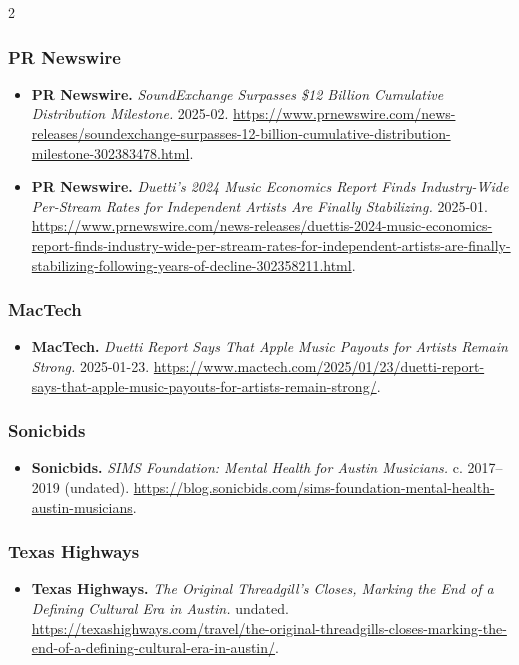 {\begin{multicols}{2}
\subsubsection*{PR Newswire}
\begin{itemize}[itemsep=0pt,topsep=1pt,parsep=0pt,partopsep=0pt,leftmargin=1em]
\item \textbf{PR Newswire.} \textit{SoundExchange Surpasses \$12 Billion Cumulative Distribution Milestone.} 2025-02. \url{https://www.prnewswire.com/news-releases/soundexchange-surpasses-12-billion-cumulative-distribution-milestone-302383478.html}.
\item \textbf{PR Newswire.} \textit{Duetti’s 2024 Music Economics Report Finds Industry-Wide Per-Stream Rates for Independent Artists Are Finally Stabilizing.} 2025-01. \url{https://www.prnewswire.com/news-releases/duettis-2024-music-economics-report-finds-industry-wide-per-stream-rates-for-independent-artists-are-finally-stabilizing-following-years-of-decline-302358211.html}.
\end{itemize}
\subsubsection*{MacTech}
\begin{itemize}[itemsep=0pt,topsep=1pt,parsep=0pt,partopsep=0pt,leftmargin=1em]
\item \textbf{MacTech.} \textit{Duetti Report Says That Apple Music Payouts for Artists Remain Strong.} 2025-01-23. \url{https://www.mactech.com/2025/01/23/duetti-report-says-that-apple-music-payouts-for-artists-remain-strong/}.
\end{itemize}
\subsubsection*{Sonicbids}
\begin{itemize}[itemsep=0pt,topsep=1pt,parsep=0pt,partopsep=0pt,leftmargin=1em]
\item \textbf{Sonicbids.} \textit{SIMS Foundation: Mental Health for Austin Musicians.} c. 2017--2019 (undated). \url{https://blog.sonicbids.com/sims-foundation-mental-health-austin-musicians}.
\end{itemize}
\subsubsection*{Texas Highways}
\begin{itemize}[itemsep=0pt,topsep=1pt,parsep=0pt,partopsep=0pt,leftmargin=1em]
\item \textbf{Texas Highways.} \textit{The Original Threadgill’s Closes, Marking the End of a Defining Cultural Era in Austin.} undated. \url{https://texashighways.com/travel/the-original-threadgills-closes-marking-the-end-of-a-defining-cultural-era-in-austin/}.
\end{itemize}
\end{multicols}
}

